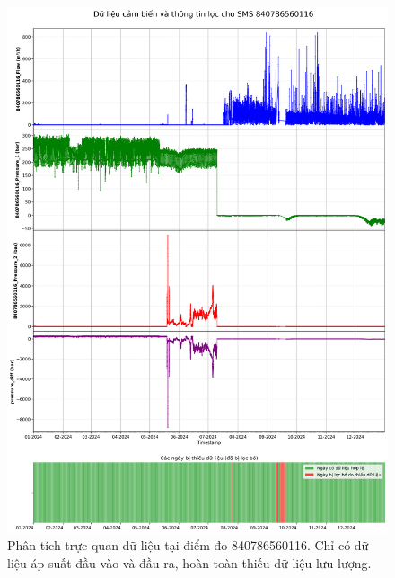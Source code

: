 \begin{figure}[htbp]
    \centering
    \includegraphics[width=\textwidth]{image/section6_1/timeseries_combined_840786560116.png}
    \caption{Phân tích trực quan dữ liệu tại điểm đo 840786560116. Chỉ có dữ liệu áp suất đầu vào và đầu ra, hoàn toàn thiếu dữ liệu lưu lượng.}
    \label{fig:no_flow_data_841210802047}
\end{figure}

